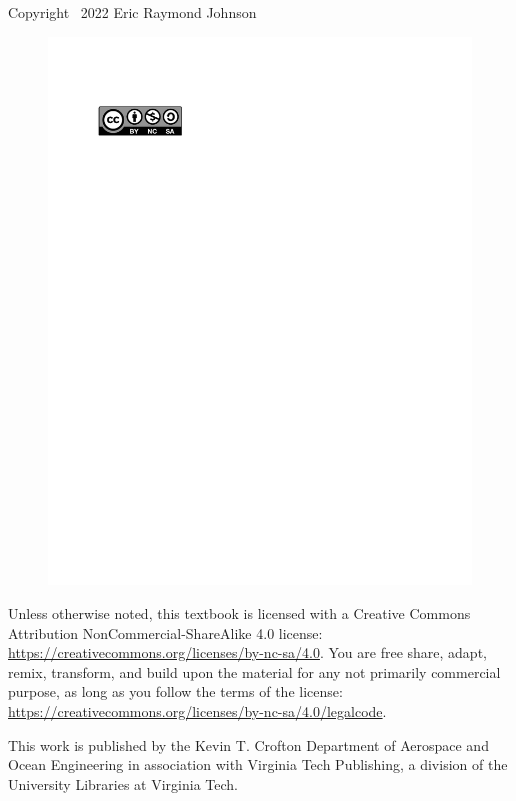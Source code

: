 \documentclass{AeroStructure-ERJohnson}
\begin{document}
\begin{copyrt}
Copyright \textcopyright\ 2022 Eric Raymond Johnson

\begin{figure}
\vspace{-18pt}
\includegraphics{CR_Logo.pdf}
\end{figure}
Unless otherwise noted, this textbook is licensed with a Creative
Commons\\
Attribution NonCommercial-ShareAlike 4.0 license:\\
\url{https://creativecommons.org/licenses/by-nc-sa/4.0}. You are free \break share, adapt, remix, transform, and build upon
the material for any not primarily commercial
purpose, as long as you follow the terms of the license:\\
\url{https://creativecommons.org/licenses/by-nc-sa/4.0/legalcode}.

This work is published by the Kevin T. Crofton Department of Aerospace and Ocean Engineering in association
with Virginia Tech Publishing, a division of the University Libraries at Virginia Tech.


\end{copyrt}
\end{document}
